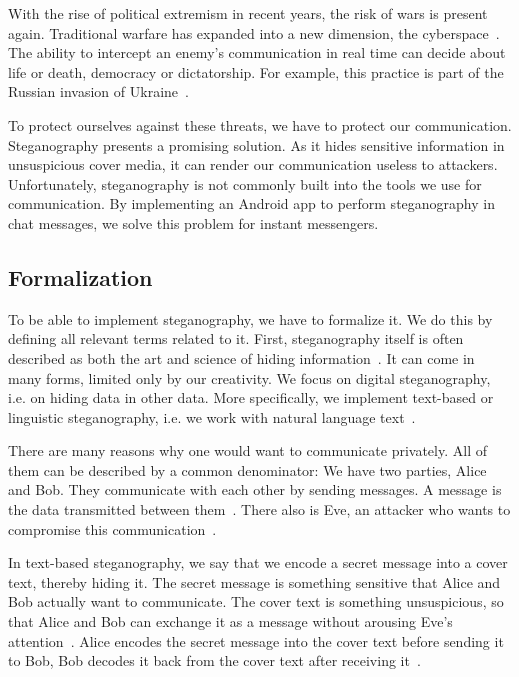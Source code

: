 With the rise of political extremism in recent years, the risk of wars is present again. Traditional warfare has expanded into a new dimension, the cyberspace~\cite{serpanosCyberwarfareUkraine2022}. The ability to intercept an enemy's communication in real time can decide about life or death, democracy or dictatorship. For example, this practice is part of the Russian invasion of Ukraine~\cite{sufiSocialMediaAnalytics2023}.

To protect ourselves against these threats, we have to protect our communication. Steganography presents a promising solution. As it hides sensitive information in unsuspicious cover media, it can render our communication useless to attackers. Unfortunately, steganography is not commonly built into the tools we use for communication. By implementing an Android app to perform steganography in chat messages, we solve this problem for instant messengers.

\subsection{Formalization}
\label{sec:formalization}
To be able to implement steganography, we have to formalize it. We do this by defining all relevant terms related to it. First, steganography itself is often described as both the art and science of hiding information~\cite{bennettLinguisticSteganographySurvey2004,wuGenerativeTextSteganography2024}. It can come in many forms, limited only by our creativity. We focus on digital steganography, i.e. on hiding data in other data. More specifically, we implement text-based or linguistic steganography, i.e. we work with natural language text~\cite{zieglerNeuralLinguisticSteganography2019}.

There are many reasons why one would want to communicate privately. All of them can be described by a common denominator: We have two parties, Alice and Bob. They communicate with each other by sending messages. A message is the data transmitted between them~\cite{wuGenerativeTextSteganography2024}. There also is Eve, an attacker who wants to compromise this communication~\cite{al-aniOverviewMainFundamentals2010,wuGenerativeTextSteganography2024}.

In text-based steganography, we say that we encode a secret message into a cover text, thereby hiding it. The secret message is something sensitive that Alice and Bob actually want to communicate. The cover text is something unsuspicious, so that Alice and Bob can exchange it as a message without arousing Eve's attention~\cite{al-aniOverviewMainFundamentals2010}. Alice encodes the secret message into the cover text before sending it to Bob, Bob decodes it back from the cover text after receiving it~\cite{al-aniOverviewMainFundamentals2010}.

